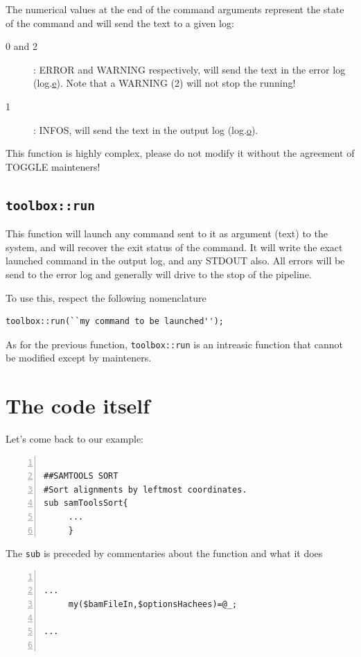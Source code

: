 \documentclass[a4paper,10pt]{report}
\begin{document}
The numerical values at the end of the command arguments represent the state of the command and will send the text to a given log:
\begin{description}
 \item [0 and 2]: ERROR and WARNING respectively, will send the text in the error log (log.\underline{e}). Note that a WARNING (2) will not stop the running!
 \item [1]: INFOS, will send the text in the output log (log.\underline{o}).
\end{description}

This function is highly complex, please do not modify it without the agreement of TOGGLE mainteners!

\subsection{\texttt{toolbox::run}}


This function will launch any command sent to it as argument (text) to the system, and will recover the exit status of the command.
It will write the exact launched command in the output log, and any STDOUT also. All errors will be send to the error log and generally will drive to the stop of the pipeline.

To use this, respect the following nomenclature

\begin{lstlisting}
toolbox::run(``my command to be launched'');
\end{lstlisting}



As for the previous function, \texttt{toolbox::run} is an intreasic function that cannot be modified except by mainteners.


\section{The code itself}

Let's come back to our example:

\begin{lstlisting}[numbers=left]

##SAMTOOLS SORT
#Sort alignments by leftmost coordinates.
sub samToolsSort{
     ...
     }

\end{lstlisting}

The \texttt{sub} is preceded by commentaries about the function and what it does

\begin{lstlisting}[numbers=left]

...
     my($bamFileIn,$optionsHachees)=@_;
         
...


\end{lstlisting}
\end{document}
